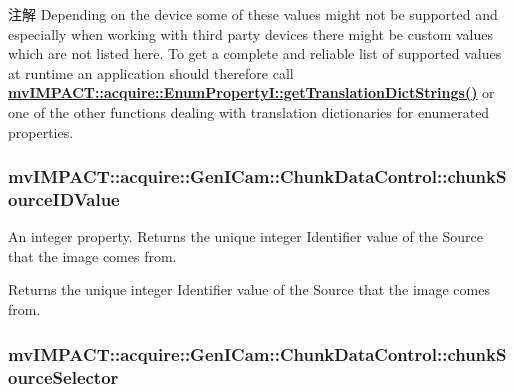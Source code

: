 \begin{DoxyNote}{注解}
Depending on the device some of these values might not be supported and especially when working with third party devices there might be custom values which are not listed here. To get a complete and reliable list of supported values at runtime an application should therefore call {\bfseries \hyperlink{classmv_i_m_p_a_c_t_1_1acquire_1_1_enum_property_i_a0ba6ccbf5ee69784d5d0b537924d26b6}{mv\+I\+M\+P\+A\+C\+T\+::acquire\+::\+Enum\+Property\+I\+::get\+Translation\+Dict\+Strings()}} or one of the other functions dealing with translation dictionaries for enumerated properties. 
\end{DoxyNote}
\hypertarget{classmv_i_m_p_a_c_t_1_1acquire_1_1_gen_i_cam_1_1_chunk_data_control_adc24abab055024927db1829bdbd17b74}{
\subsubsection[{chunk\+Source\+I\+D\+Value}]{ mv\+I\+M\+P\+A\+C\+T\+::acquire\+::\+Gen\+I\+Cam\+::\+Chunk\+Data\+Control\+::chunk\+Source\+I\+D\+Value}}\label{classmv_i_m_p_a_c_t_1_1acquire_1_1_gen_i_cam_1_1_chunk_data_control_adc24abab055024927db1829bdbd17b74}


An integer property. Returns the unique integer Identifier value of the Source that the image comes from. 

Returns the unique integer Identifier value of the Source that the image comes from. \hypertarget{classmv_i_m_p_a_c_t_1_1acquire_1_1_gen_i_cam_1_1_chunk_data_control_acab8906c60d43214bdbc540dafa7a62e}{
\subsubsection[{chunk\+Source\+Selector}]{ mv\+I\+M\+P\+A\+C\+T\+::acquire\+::\+Gen\+I\+Cam\+::\+Chunk\+Data\+Control\+::chunk\+Source\+Selector}}\label{classmv_i_m_p_a_c_t_1_1acquire_1_1_gen_i_cam_1_1_chunk_data_control_acab8906c60d43214bdbc540dafa7a62e}


